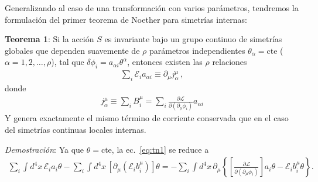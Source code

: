
Generalizando al caso de una transformación con varios parámetros, tendremos la formulación del primer teorema de Noether para simetrías internas:

\begin{frame}
\textbf{Teorema 1}: Si la acción $S$ es invariante bajo un grupo continuo de simetrías globales que dependen suavemente de $\rho$ parámetros independientes $\theta_{\alpha}=\text{cte}$ ($\alpha=1,2,\ldots, \rho$), tal que $\delta\phi_i=a_{\alpha i}\theta^{\alpha}$, entonces existen las $\rho$ relaciones
\begin{align}
\sum_{i}\mathcal{E}_i a_{\alpha i}\equiv \partial_{\mu} j^{\mu}_{\alpha}\,,  
\end{align}
donde
\begin{align}
j^{\mu}_{\alpha}\equiv \sum_{i}B^{\mu}_i=\sum_{i}  \frac{\partial\mathcal{L}}{\partial(\partial_{\mu}\phi_i)}a_{\alpha i}
\end{align}
Y genera exactamente el mismo término de corriente conservada que en el caso del simetrías continuas locales internas.
\end{frame}

\emph{Demostración}:  Ya que $\theta=\text{cte}$, la ec.~\eqref{eq:tn1} se reduce a
\begin{align*}
    \sum_i \int {d^4}x\, \mathcal{E}_ia_i \theta-\sum_i \int {d^4}x\, \left[ \partial_{\mu}   \left(  \mathcal{E}_i b^{\mu}_i  \right) \right] \theta   =-  \sum_i \int {d^4}x\, \partial_{\mu} \left\{ \left[ \frac{\partial\mathcal{L}}{\partial(\partial_{\mu}\phi_i)}\right] a_i \theta  -\mathcal{E}_i b^{\mu}_i \theta  \right\}.
\end{align*}

